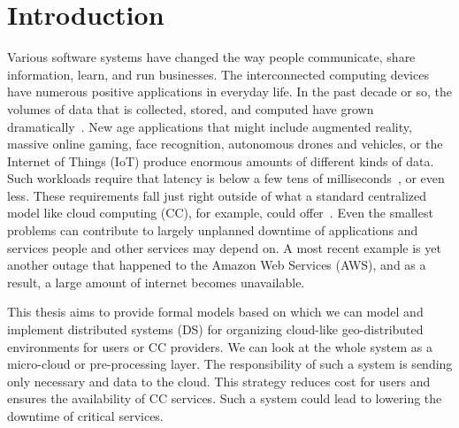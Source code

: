 \pagestyle{fancy}
\fancyhf{}
\fancyhead[RE,LO]{\leftmark}
\fancyfoot[CE,CO]{\thepage}
\chapter{Introduction}\label{chapter:Intro}
%
Various software systems have changed the way people communicate, share information, learn, and run businesses. The interconnected computing devices have numerous positive applications in everyday life. In the past decade or so, the volumes of data that is collected, stored, and computed have grown dramatically~\cite{ChiangZ16}. New age applications that might include augmented reality, massive online gaming, face recognition, autonomous drones and vehicles, or the Internet of Things (IoT) produce enormous amounts of different kinds of data. Such workloads require that latency is below a few tens of milliseconds~\cite{ChiangZ16}, or even less. These requirements fall just right outside of what a standard centralized model like cloud computing (CC), for example, could offer~\cite{ChiangZ16}. Even the smallest problems can contribute to largely unplanned downtime of applications and services people and other services may depend on. A most recent example is yet another outage that happened to the Amazon Web Services (AWS), and as a result, a large amount of internet becomes unavailable.

This thesis aims to provide formal models based on which we can model and implement distributed systems (DS) for organizing cloud-like geo-distributed environments for users or CC providers. We can look at the whole system as a micro-cloud or pre-processing layer. The responsibility of such a system is sending only necessary and data to the cloud. This strategy reduces cost for users and ensures the availability of CC services. Such a system could lead to lowering the downtime of critical services.


